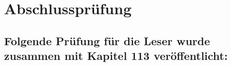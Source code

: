 
\chapter*{Abschlussprüfung}

\section*{Folgende Prüfung für die Leser wurde zusammen mit Kapitel 113 veröffentlicht:}

